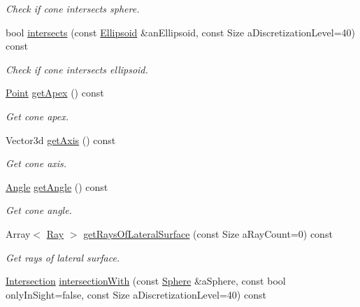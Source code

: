 \begin{DoxyCompactItemize}
\begin{DoxyCompactList}\small\item\em Check if cone intersects sphere. \end{DoxyCompactList}\item 
bool \hyperlink{classostk_1_1math_1_1geom_1_1d3_1_1objects_1_1_cone_a9e3d49951dad943e025646362253c94e}{intersects} (const \hyperlink{classostk_1_1math_1_1geom_1_1d3_1_1objects_1_1_ellipsoid}{Ellipsoid} \&an\+Ellipsoid, const Size a\+Discretization\+Level=40) const
\begin{DoxyCompactList}\small\item\em Check if cone intersects ellipsoid. \end{DoxyCompactList}\item 
\hyperlink{classostk_1_1math_1_1geom_1_1d3_1_1objects_1_1_point}{Point} \hyperlink{classostk_1_1math_1_1geom_1_1d3_1_1objects_1_1_cone_acc452d4c78df49bf3f15c840d6e15c1f}{get\+Apex} () const
\begin{DoxyCompactList}\small\item\em Get cone apex. \end{DoxyCompactList}\item 
Vector3d \hyperlink{classostk_1_1math_1_1geom_1_1d3_1_1objects_1_1_cone_a061a6572fea78dcd22b4466a57bd1b6b}{get\+Axis} () const
\begin{DoxyCompactList}\small\item\em Get cone axis. \end{DoxyCompactList}\item 
\hyperlink{classostk_1_1math_1_1geom_1_1_angle}{Angle} \hyperlink{classostk_1_1math_1_1geom_1_1d3_1_1objects_1_1_cone_ac288545383fe1514951ce13f1e7611f3}{get\+Angle} () const
\begin{DoxyCompactList}\small\item\em Get cone angle. \end{DoxyCompactList}\item 
Array$<$ \hyperlink{classostk_1_1math_1_1geom_1_1d3_1_1objects_1_1_ray}{Ray} $>$ \hyperlink{classostk_1_1math_1_1geom_1_1d3_1_1objects_1_1_cone_aad4d7147444b84a741f497b921ae62e0}{get\+Rays\+Of\+Lateral\+Surface} (const Size a\+Ray\+Count=0) const
\begin{DoxyCompactList}\small\item\em Get rays of lateral surface. \end{DoxyCompactList}\item 
\hyperlink{classostk_1_1math_1_1geom_1_1d3_1_1_intersection}{Intersection} \hyperlink{classostk_1_1math_1_1geom_1_1d3_1_1objects_1_1_cone_abaef843007b64e1a2c5b126bdcb650d8}{intersection\+With} (const \hyperlink{classostk_1_1math_1_1geom_1_1d3_1_1objects_1_1_sphere}{Sphere} \&a\+Sphere, const bool only\+In\+Sight=false, const Size a\+Discretization\+Level=40) const

\end{DoxyCompactItemize}
